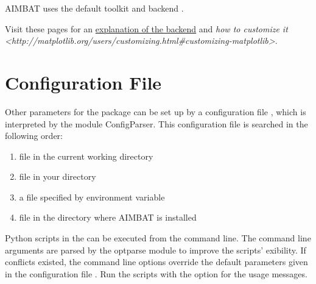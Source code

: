 \documentclass[letterpaper,10pt,english]{sphinxmanual}
\begin{document}
AIMBAT uses the default toolkit  and backend .

Visit these pages for an \href{http://matplotlib.org/faq/usage\_faq.html\#what-is-a-backend}{explanation of the backend} and \emph{how to customize it \textless{}http://matplotlib.org/users/customizing.html\#customizing-matplotlib\textgreater{}}.


\section{Configuration File}
\label{docfiles/parameterConfiguration:configuration-file}
Other parameters for the package can be set up by a configuration file , which is interpreted by the module ConfigParser. This configuration file is searched in the following order:
\begin{enumerate}
\item {} 
file  in the current working directory

\item {} 
file  in your  directory

\item {} 
a file specified by environment variable 

\item {} 
file  in the directory where AIMBAT is installed

\end{enumerate}

Python scripts in the  can be executed from the command line. The command line arguments are parsed by the optparse module to improve the scripts' exibility. If conflicts existed, the command line options override the default parameters given in the configuration file . Run the scripts with the  option for the usage messages.
\end{document}
